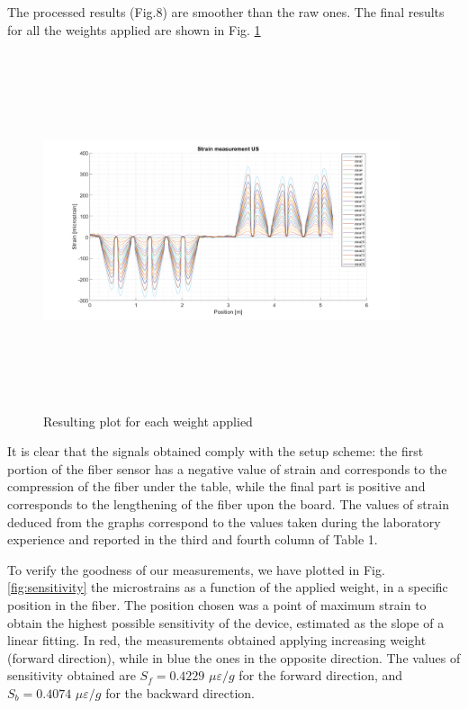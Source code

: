 The processed results (Fig.8) are smoother than the raw ones. The final results for all the weights applied are shown in Fig. \ref{fig:strain}

\begin{figure}[H]
	\centering
	\includegraphics[height=10.5cm, width=10.5cm, keepaspectratio]{img/nostro.png}
	\caption{Resulting plot for each weight applied}\label{fig:strain}
\end{figure}

It is clear that the signals obtained comply with the setup scheme: the first portion of the fiber sensor has a negative value of strain and corresponds to the compression of the fiber under the table, while the final part is positive and corresponds to the lengthening of the fiber upon the board. The values of strain deduced from the graphs correspond to the values taken during the laboratory experience and reported in the third and fourth column of Table 1.




To verify the goodness of our measurements, we have plotted in Fig. \ref{fig:sensitivity} the microstrains as a function of the applied weight, in a specific position in the fiber.  The position chosen was a point of maximum strain to obtain the highest possible sensitivity of the device, estimated as the slope of a linear fitting. In red, the measurements obtained applying increasing weight (forward direction), while in blue the ones in the opposite direction. The values of sensitivity obtained are $S_f = 0.4229$ $\mu \varepsilon / g$ for the forward direction, and $S_b = 0.4074$ $\mu \varepsilon / g$ for the backward direction.

